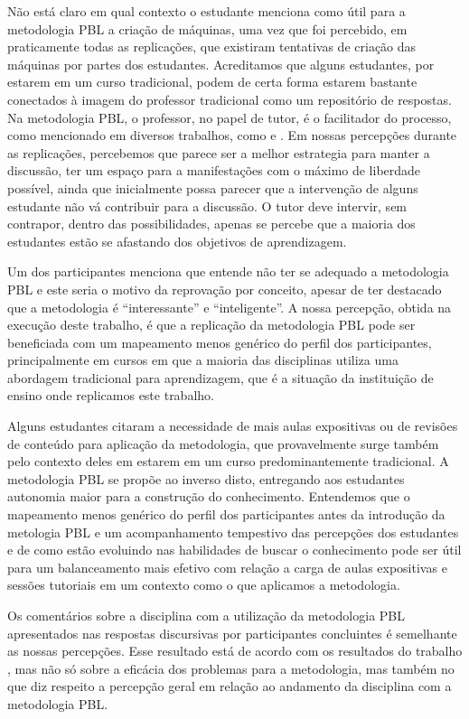 Não está claro em qual contexto o estudante menciona como útil
para a metodologia PBL a criação de máquinas, uma vez que
foi percebido, em praticamente todas as replicações, que
existiram tentativas de criação das máquinas por partes
dos estudantes.
Acreditamos que alguns estudantes, por estarem em um curso
tradicional, podem de certa forma estarem bastante conectados
à imagem do professor tradicional como um repositório de
respostas.
Na metodologia PBL, o professor, no papel de tutor, é o facilitador
do processo, como mencionado em diversos trabalhos, como
\cite{hmelo2004problem} e \cite{savery2015overview}.
Em nossas percepções durante as replicações, percebemos que
parece ser a melhor estrategia para manter a discussão, ter um
espaço para a manifestações com o máximo de liberdade possível,
ainda que inicialmente possa parecer que a intervenção
de alguns estudante não vá contribuir para
a discussão.
O tutor deve intervir, sem contrapor, dentro das possibilidades,
apenas se percebe que a maioria dos estudantes estão se afastando
dos objetivos de aprendizagem.

Um dos participantes menciona que entende não ter se adequado
a metodologia PBL e este seria o motivo da reprovação por conceito,
apesar de ter destacado que a metodologia é ``interessante'' e ``inteligente''.
A nossa percepção, obtida na execução deste trabalho, é que a replicação
da metodologia PBL pode ser beneficiada com um mapeamento menos genérico
do perfil dos participantes, principalmente em cursos em que a maioria
das disciplinas utiliza uma abordagem tradicional para aprendizagem, que
é a situação da instituição de ensino onde replicamos este trabalho.

Alguns estudantes citaram a necessidade de mais aulas
expositivas ou de revisões de conteúdo para aplicação
da metodologia, que provavelmente surge também pelo
contexto deles em estarem em um curso
predominantemente tradicional.
A metodologia PBL se propõe ao inverso disto, entregando
aos estudantes autonomia maior para a construção
do conhecimento.
Entendemos que o mapeamento menos genérico do perfil
dos participantes antes da introdução da metologia PBL
e um acompanhamento tempestivo das percepções dos estudantes
e de como estão evoluindo nas habilidades de buscar o conhecimento
pode ser útil para um balanceamento mais efetivo com
relação a carga de aulas expositivas e sessões tutoriais
em um contexto como o que aplicamos a metodologia.

Os comentários sobre a disciplina com a utilização da metodologia PBL
apresentados nas respostas discursivas por participantes concluintes
é semelhante as nossas percepções.
Esse resultado está de acordo com os resultados do
trabalho \cite{sockalingam2011student}, mas não só sobre a eficácia
dos problemas para a metodologia, mas também no que diz respeito
a percepção geral em relação ao andamento da disciplina
com a metodologia PBL.

